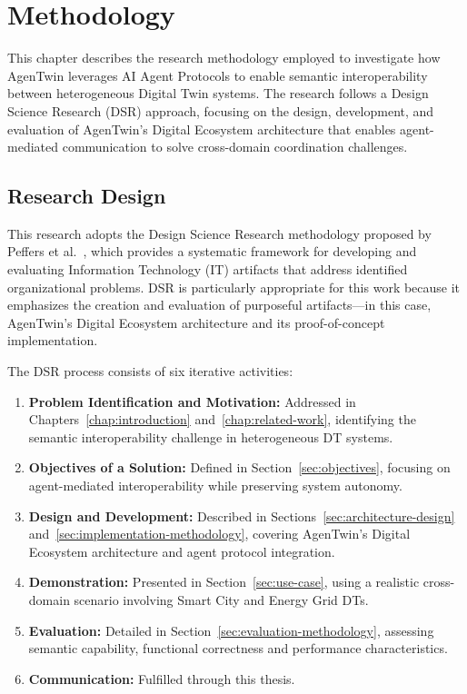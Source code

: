 \chapter{Methodology}
\label{chap:methodology}

This chapter describes the research methodology employed to
    investigate how AgenTwin leverages AI Agent Protocols to enable semantic interoperability between
    heterogeneous Digital Twin systems.
The research follows a Design Science Research (DSR) approach, focusing on
    the design, development, and evaluation of AgenTwin's Digital Ecosystem architecture that
    enables agent-mediated communication to solve cross-domain coordination challenges.

\section{Research Design}
\label{sec:research-design}

This research adopts the Design Science Research methodology proposed by
    Peffers et al.~\cite{peffers2007}, which provides a
    systematic framework for developing and evaluating Information Technology (IT) artifacts that
    address identified organizational problems.
DSR is particularly appropriate for this work because it
    emphasizes the creation and evaluation of
    purposeful artifacts---in this case,
    AgenTwin's Digital Ecosystem architecture and its proof-of-concept implementation.

The DSR process consists of six iterative activities:

\begin{enumerate}
    \item \textbf{Problem Identification and Motivation:}
    Addressed in Chapters~\ref{chap:introduction} and~\ref{chap:related-work},
        identifying the semantic interoperability challenge in heterogeneous DT systems.
    
    \item \textbf{Objectives of a Solution:}
    Defined in Section~\ref{sec:objectives},
        focusing on agent-mediated interoperability while preserving system autonomy.
    
    \item \textbf{Design and Development:}
    Described in Sections~\ref{sec:architecture-design} and~\ref{sec:implementation-methodology},
        covering AgenTwin's Digital Ecosystem architecture and agent protocol integration.
    
    \item \textbf{Demonstration:}
    Presented in Section~\ref{sec:use-case},
        using a realistic cross-domain scenario involving Smart City and Energy Grid DTs.

    \item \textbf{Evaluation:}
    Detailed in Section~\ref{sec:evaluation-methodology}, assessing
        semantic capability,
        functional correctness and
        performance characteristics.
    
    \item \textbf{Communication:}
    Fulfilled through this thesis.
\end{enumerate}

